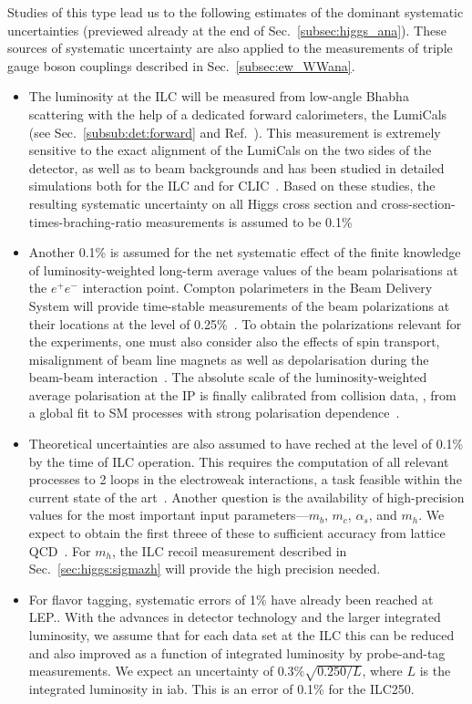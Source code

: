 Studies of this type lead us to the following estimates of the dominant systematic uncertainties (previewed already at the end of Sec.~\ref{subsec:higgs_ana}).  These sources of systematic uncertainty are also applied to the measurements of triple gauge boson couplings described 
in Sec.~\ref{subsec:ew_WWana}.
\begin{itemize}
\item The luminosity at the ILC will be measured from low-angle Bhabha scattering with the help of a dedicated forward calorimeters, the LumiCals (see Sec.~\ref{subsub:det:forward} and Ref.~\cite{Abramowicz:2010bg}). This measurement is extremely sensitive to the exact alignment of the LumiCals on the two sides of the detector, as well as to beam backgrounds and has been studied in detailed simulations both for the ILC and for CLIC~\cite{Bozovic-Jelisavcic:2014aza, Lukic:2013fw}. Based on these studies, the resulting systematic uncertainty on all Higgs cross section and cross-section-times-braching-ratio measurements is assumed to be 0.1\%
\item Another 0.1\% is assumed for the net systematic effect of the finite knowledge of luminosity-weighted long-term average values of the beam polarisations at the $e^+e^-$ interaction point.    Compton polarimeters in the Beam Delivery System will provide 
time-stable measurements of the beam polarizations at their locations at the level of 0.25\%~\cite{Vormwald:2015hla, List:2015lsa}.  To obtain the polarizations relevant for 
the experiments, one must also consider also the effects of spin transport, misalignment of beam line magnets as well as depolarisation during the beam-beam interaction~\cite{Beckmann:2014mka}. The absolute scale of the luminosity-weighted average polarisation at the IP is finally calibrated from collision data, \eg, from a global fit to SM processes with strong polarisation dependence~\cite{bib:PhDRobert}. 
\item Theoretical uncertainties are also assumed to have reched at the level of 0.1\% by the time of ILC operation.   This requires the computation of all relevant processes to 2 loops in the electroweak interactions, a task feasible within the current state of the art~\cite{Blondel:2019qlh}.  Another question is the availability of high-precision values for the most important input parameters---$m_b$, $m_c$, $\alpha_s$, and $m_h$.  We expect to obtain the first threee  of these to sufficient accuracy from lattice QCD~\cite{Lepage:2014fla}.
For $m_h$, the  ILC recoil measurement described in Sec.~\ref{sec:higgs:sigmazh} will provide 
the high precision needed.
\item For flavor tagging, systematic errors of 1\% have already been reached at LEP.. With the advances in detector technology and the larger integrated luminosity, we assume that for each data set at the ILC this can be reduced  and also improved as  a function of integrated luminosity by probe-and-tag measurements.   We expect an uncertainty of 
$0.3\% \sqrt{0.250/L}$, where $L$ is the integrated luminosity in iab.  This is an error of 0.1\% for the ILC250.


\end{itemize}
